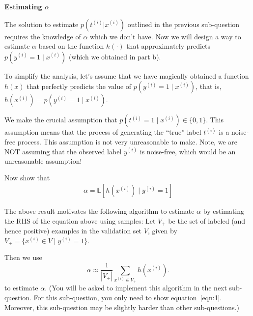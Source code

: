 \item {} \textbf{Estimating $\alpha$}


The solution to estimate $p(t^{(i)}|x^{(i)})$ outlined in the previous sub-question requires the knowledge of $\alpha$ which we don't have. Now we will design a way to estimate $\alpha$ based on the function $h(\cdot)$ that approximately predicts $p(y^{(i)}=1\mid x^{(i)})$ (which we obtained in part b).  

To simplify the analysis, let's assume that we have magically obtained a function $h(x)$ that perfectly predicts the value of $p(y^{(i)}=1\mid x^{(i)})$, that is, $h(x^{(i)} )= p(y^{(i)} = 1\mid x^{(i)})$.

We make the crucial assumption that $p(t^{(i)}=1\mid x^{(i)}) \in \{0,1\}$. This assumption means that the process of generating the ``true'' label $t^{(i)}$ is a noise-free process. This assumption is not very unreasonable to make. Note, we are NOT assuming that the observed label $y^{(i)}$ is noise-free, which would be an unreasonable assumption!

Now show that 
\begin{align}
\alpha = \mathbb{E}[h(x^{(i)})\mid y^{(i)}=1] \label{eqn:1}
\end{align}

The above result motivates the following algorithm to estimate $\alpha$ by estimating the RHS of the equation above using samples: 
Let $V_{+}$ be the set of labeled (and hence positive) examples in the validation set $V$, given by $V_{+} = \{x^{(i)}\in V\mid y^{(i)} = 1\}$.

Then we use 
\begin{equation*}
\alpha \approx \frac{1}{|V_{+}|}\sum_{x^{(i)}\in V_{+}} h(x^{(i)}).
\end{equation*}
to estimate $\alpha$. (You will be asked to implement this algorithm in the next sub-question. For this sub-question, you only need to show equation~\eqref{eqn:1}. Moreover, this sub-question may be slightly harder than other sub-questions.)

